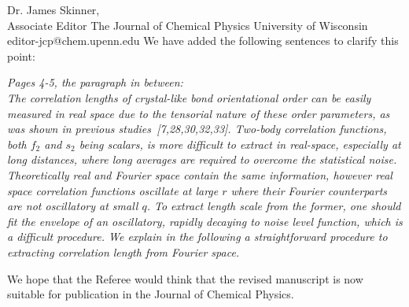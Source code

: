 \documentclass[a4paper, rebuttal, parskip=true, firsthead=false, fromemail=false, foldmarks=false]{scrlttr2}
\begin{document}
\begin{letter}{Dr. James Skinner,\\Associate Editor
The Journal of Chemical Physics
University of Wisconsin\\
editor-jcp@chem.upenn.edu }
We have added the following sentences to clarify this point:

{\it Pages 4-5, the paragraph in between:\\
The correlation lengths of crystal-like bond orientational order can be easily measured in real space due to the tensorial nature
of these order parameters, as was shown in previous studies~[7,28,30,32,33]. Two-body
correlation functions, both $f_2$ and $s_2$ being scalars, is more difficult to extract in real-space, especially at long distances,
where long averages are required to overcome the statistical noise. Theoretically real and Fourier space contain the same information, however real space correlation functions oscillate at large $r$ where their Fourier counterparts are not oscillatory at small $q$. To extract length scale from the former, one should fit the envelope of an oscillatory, rapidly decaying to noise level function, which is a difficult procedure. We explain in the following a straightforward procedure to extracting correlation length from Fourier space.
}



We hope that the Referee would think that the revised manuscript is now suitable for publication in the Journal of Chemical Physics.



\end{letter} 
\end{document}
